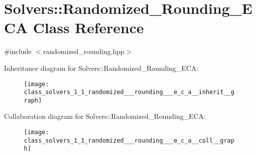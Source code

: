 \hypertarget{class_solvers_1_1_randomized___rounding___e_c_a}{}\section{Solvers\+:\+:Randomized\+\_\+\+Rounding\+\_\+\+E\+CA Class Reference}
\label{class_solvers_1_1_randomized___rounding___e_c_a}


{\ttfamily \#include $<$randomized\+\_\+rounding.\+hpp$>$}



Inheritance diagram for Solvers\+:\+:Randomized\+\_\+\+Rounding\+\_\+\+E\+CA\+:\nopagebreak
\begin{figure}[H]
\begin{center}
\leavevmode
\texttt{[image: class\_solvers\_1\_1\_randomized\_\_\_rounding\_\_\_e\_c\_a\_\_inherit\_\_graph]}
\end{center}
\end{figure}


Collaboration diagram for Solvers\+:\+:Randomized\+\_\+\+Rounding\+\_\+\+E\+CA\+:\nopagebreak
\begin{figure}[H]
\begin{center}
\leavevmode
\texttt{[image: class\_solvers\_1\_1\_randomized\_\_\_rounding\_\_\_e\_c\_a\_\_coll\_\_graph]}
\end{center}
\end{figure}
